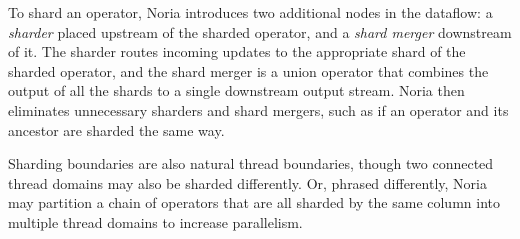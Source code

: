 To shard an operator, Noria introduces two additional nodes in the dataflow: a
\emph{sharder} placed upstream of the sharded operator, and a \emph{shard
merger} downstream of it. The sharder routes incoming updates to the appropriate
shard of the sharded operator, and the shard merger is a union operator that
combines the output of all the shards to a single downstream output stream.
Noria then eliminates unnecessary sharders and shard mergers, such as if an
operator and its ancestor are sharded the same way.

Sharding boundaries are also natural thread boundaries, though two connected
thread domains may also be sharded differently. Or, phrased differently, Noria
may partition a chain of operators that are all sharded by the same column into
multiple thread domains to increase parallelism.


